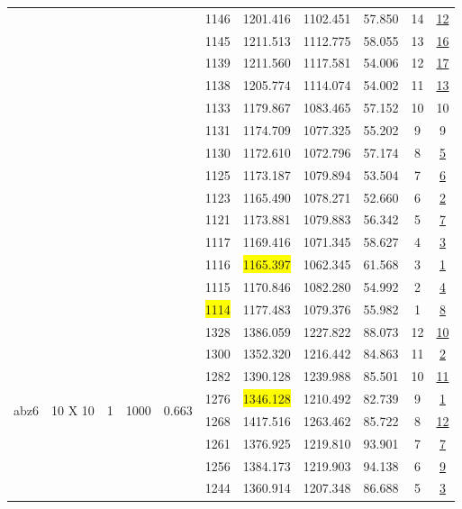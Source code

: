 \begin{table}[h]
{\begin{tabular}{l@{\hskip 0.1in}c@{\hskip 0.1in}c@{\hskip 0.1in}c@{\hskip 0.1in}c@{\hskip 0.1in}c@{\hskip 0.1in}c@{\hskip 0.1in}c@{\hskip 0.1in}c@{\hskip 0.1in}c@{\hskip 0.1in}c@{\hskip 0.1in}}
&  &  &  &  & 1146 & 1201.416 & 1102.451 & 57.850 & 14 & \underline{12}\\
&  &  &  &  & 1145 & 1211.513 & 1112.775 & 58.055 & 13 &  \underline{16}\\
&  &  &  &  & 1139 & 1211.560 & 1117.581 & 54.006 & 12 & \underline{17}\\
&  &  &  &  & 1138 & 1205.774 & 1114.074 & 54.002 & 11 & \underline{13}\\
&  &  &  &  & 1133 & 1179.867 & 1083.465 & 57.152 & 10 & 10\\
&  &  &  &  & 1131 & 1174.709 & 1077.325 & 55.202 & 9 & 9\\
&  &  &  &  & 1130 & 1172.610 & 1072.796 & 57.174 & 8 & \underline{5}\\
&  &  &  &  & 1125 & 1173.187 & 1079.894 & 53.504 & 7 & \underline{6}\\
&  &  &  &  & 1123 & 1165.490 & 1078.271 & 52.660 & 6 & \underline{2}\\
&  &  &  &  & 1121 & 1173.881 & 1079.883 & 56.342 & 5 & \underline{7}\\
&  &  &  &  & 1117 & 1169.416 & 1071.345 & 58.627 & 4 & \underline{3}\\
&  &  &  &  & 1116 & \colorbox{yellow}{1165.397} & 1062.345 & 61.568 & 3 & \underline{1}\\
&  &  &  &  & 1115 & 1170.846 & 1082.280 & 54.992 & 2 & \underline{4}\\
&  &  &  &  & \colorbox{yellow}{1114} & 1177.483 & 1079.376 & 55.982 & 1 & \underline{8}\\
\midrule
\multirow{12}{*}{abz6} & \multirow{12}{*}{10 X 10} & \multirow{12}{*}{1} & \multirow{12}{*}{1000} & \multirow{12}{*}{0.663}& 1328 & 1386.059 & 1227.822 & 88.073 & 12 & \underline{10}\\
&  &  &  &  & 1300 & 1352.320 & 1216.442 & 84.863 & 11 & \underline{2}\\
&  &  &  &  & 1282 & 1390.128 & 1239.988 & 85.501 & 10 & \underline{11}\\
&  &  &  &  & 1276 & \colorbox{yellow}{1346.128} & 1210.492 & 82.739 & 9 & \underline{1}\\
&  &  &  &  & 1268 & 1417.516 & 1263.462 & 85.722 & 8 & \underline{12}\\
&  &  &  &  & 1261 & 1376.925 & 1219.810 & 93.901 & 7 & \underline{7}\\
&  &  &  &  & 1256 & 1384.173 & 1219.903 & 94.138 & 6 & \underline{9}\\
&  &  &  &  & 1244 & 1360.914 & 1207.348 & 86.688 & 5 & \underline{3}\\

\end{tabular}}
\end{table}
